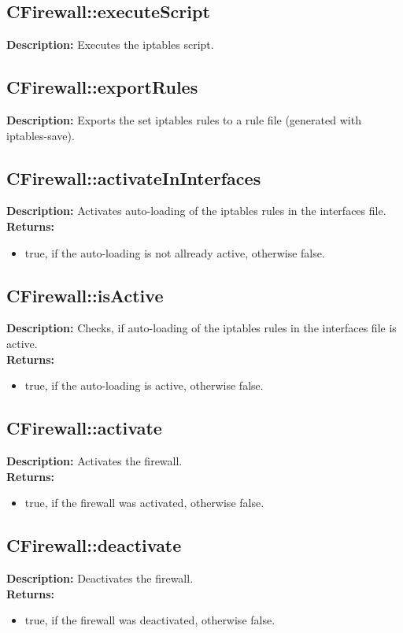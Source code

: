 \subsection{CFirewall::executeScript}
\textbf{Description:} Executes the iptables script.\\

\subsection{CFirewall::exportRules}
\textbf{Description:} Exports the set iptables rules to a rule file (generated with iptables-save).\\

\subsection{CFirewall::activateInInterfaces}
\textbf{Description:} Activates auto-loading of the iptables rules in the interfaces file.\\
\textbf{Returns:}
\begin{itemize}
\item true, if the auto-loading is not allready active, otherwise false.
\end{itemize}

\subsection{CFirewall::isActive}
\textbf{Description:} Checks, if auto-loading of the iptables rules in the interfaces file is active.\\
\textbf{Returns:}
\begin{itemize}
\item true, if the auto-loading is active, otherwise false.
\end{itemize}

\subsection{CFirewall::activate}
\textbf{Description:} Activates the firewall.\\
\textbf{Returns:}
\begin{itemize}
\item true, if the firewall was activated, otherwise false.
\end{itemize}

\subsection{CFirewall::deactivate}
\textbf{Description:} Deactivates the firewall.\\
\textbf{Returns:}
\begin{itemize}
\item true, if the firewall was deactivated, otherwise false.
\end{itemize}

